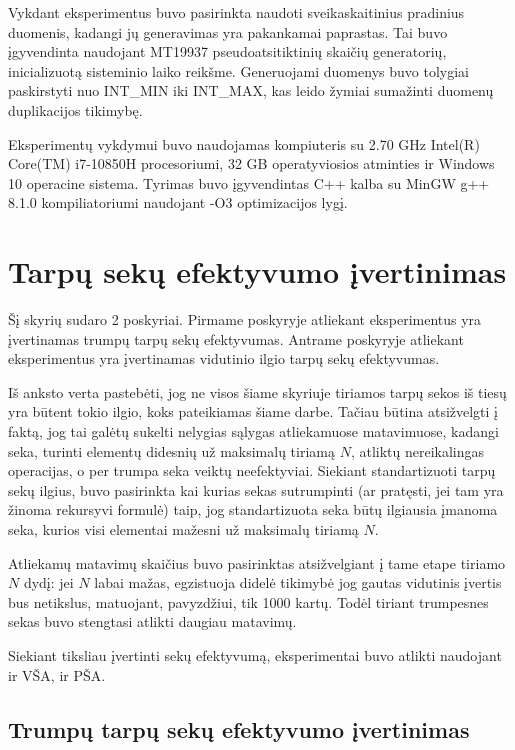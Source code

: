 \documentclass{VUMIFInfKursinis}
\begin{document}
Vykdant eksperimentus buvo pasirinkta naudoti sveikaskaitinius pradinius duomenis, kadangi jų generavimas yra pakankamai paprastas.
Tai buvo įgyvendinta naudojant MT19937 pseudoatsitiktinių skaičių generatorių, inicializuotą sisteminio laiko reikšme.
Generuojami duomenys buvo tolygiai paskirstyti nuo INT\_MIN iki INT\_MAX, kas leido žymiai sumažinti duomenų duplikacijos tikimybę.

Eksperimentų vykdymui buvo naudojamas kompiuteris su 2.70 GHz Intel(R) Core(TM) i7-10850H procesoriumi,
32 GB operatyviosios atminties ir Windows 10 operacine sistema.
Tyrimas buvo įgyvendintas C++ kalba su MinGW g++ 8.1.0 kompiliatoriumi naudojant -O3 optimizacijos lygį.

\section{Tarpų sekų efektyvumo įvertinimas}

Šį skyrių sudaro 2 poskyriai.
Pirmame poskyryje atliekant eksperimentus yra įvertinamas trumpų tarpų sekų efektyvumas.
Antrame poskyryje atliekant eksperimentus yra įvertinamas vidutinio ilgio tarpų sekų efektyvumas.

Iš anksto verta pastebėti, jog ne visos šiame skyriuje tiriamos tarpų sekos iš tiesų yra būtent tokio ilgio, koks pateikiamas šiame darbe.
Tačiau būtina atsižvelgti į faktą, jog tai galėtų sukelti nelygias sąlygas atliekamuose matavimuose,
kadangi seka, turinti elementų didesnių už maksimalų tiriamą $N$, atliktų nereikalingas operacijas, o per trumpa seka veiktų neefektyviai.
Siekiant standartizuoti tarpų sekų ilgius, buvo pasirinkta kai kurias sekas sutrumpinti (ar pratęsti, jei tam yra žinoma rekursyvi formulė)
taip, jog standartizuota seka būtų ilgiausia įmanoma seka, kurios visi elementai mažesni už maksimalų tiriamą $N$.

Atliekamų matavimų skaičius buvo pasirinktas atsižvelgiant į tame etape tiriamo $N$ dydį: jei $N$ labai mažas,
egzistuoja didelė tikimybė jog gautas vidutinis įvertis bus netikslus, matuojant, pavyzdžiui, tik 1000 kartų.
Todėl tiriant trumpesnes sekas buvo stengtasi atlikti daugiau matavimų.

Siekiant tiksliau įvertinti sekų efektyvumą, eksperimentai buvo atlikti
naudojant ir VŠA, ir PŠA.

\subsection{Trumpų tarpų sekų efektyvumo įvertinimas}
\end{document}
